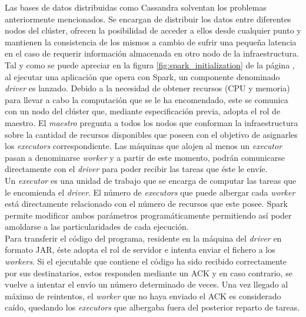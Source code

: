 Las bases de datos distribuidas como Cassandra solventan los problemas anteriormente mencionados. Se encargan de distribuir los datos entre diferentes nodos del clúster, ofrecen la posibilidad de acceder a ellos desde cualquier punto y mantienen la consistencia de los mismos a cambio de sufrir una pequeña latencia en el caso de requerir información almacenada en otro nodo de la infraestructura.\\ 

Tal y como se puede apreciar en la figura \ref{fig:spark_initialization} de la página \pageref{fig:spark_initialization}, al ejecutar una aplicación que opera con Spark, un componente denominado \textit{driver} es lanzado. Debido a la necesidad de obtener recursos (CPU y memoria) para llevar a cabo la computación que se le ha encomendado, este se comunica con un nodo del clúster que, mediante especificación previa, adopta el rol de maestro. El \textit{maestro} pregunta a todos los nodos que conforman la infraestructura sobre la cantidad de recursos disponibles que poseen con el objetivo de asignarles los \textit{executors} correspondiente. Las máquinas que alojen al menos un \textit{executor} pasan a denominarse \textit{worker} y a partir de este momento, podrán comunicarse directamente con el \textit{driver} para poder recibir las tareas que éste le envíe.\\

Un \textit{executor} es una unidad de trabajo que se encarga de computar las tareas que le encomienda el \textit{driver}. El número de \textit{executors} que puede albergar cada \textit{worker} está directamente relacionado con el número de recursos que este posee. Spark permite modificar ambos parámetros programáticamente permitiendo así poder amoldarse a las particularidades de cada ejecución.\\

Para transferir el código del programa, residente en la máquina del \textit{driver} en formato JAR, éste adopta  el rol de servidor e intenta enviar el fichero a los \textit{workers}. Si el ejecutable que contiene el código ha sido recibido correctamente por sus destinatarios, estos responden mediante un ACK y en caso contrario, se vuelve a intentar el envío un número determinado de veces. Una vez llegado al máximo de reintentos, el \textit{worker} que no haya enviado el ACK es considerado caído, quedando los \textit{executors} que albergaba fuera del posterior reparto de tareas.

